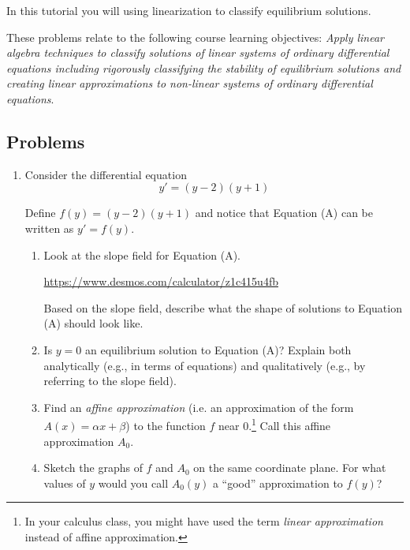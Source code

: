 \begin{objectives}
	In this tutorial you will using linearization to classify equilibrium solutions.

	These problems relate to the following course learning objectives:
	\textit{Apply linear algebra techniques to classify solutions of linear systems of ordinary differential
	equations including rigorously classifying the stability of equilibrium solutions and creating
	linear approximations to non-linear systems of ordinary differential equations}.
\end{objectives}


\subsection*{Problems}

\begin{enumerate}
	\item 	Consider the differential equation
	      \begin{equation}
		      y'=(y-2)(y+1)\tag{A}
	      \end{equation}

	      Define $f(y)=(y-2)(y+1)$ and notice that Equation (A) can be written as $y'=f(y)$.

	      \begin{enumerate}
		      \item Look at the slope field for Equation (A).

		            \url{https://www.desmos.com/calculator/z1c415u4fb}

		            Based on the slope field, describe what the shape of solutions to Equation (A) should look like.

		      \item Is $y=0$ an equilibrium solution to Equation (A)? Explain both analytically (e.g., in terms of equations)
		            and qualitatively (e.g., by referring to the slope field).
		      \item Find an \emph{affine approximation} (i.e. an approximation of the form $A(x) = \alpha x+\beta$)
		            to the function $f$ near $0$.\footnote{ In your calculus class, you might have used the term
			            \emph{linear approximation} instead of affine approximation.} Call this affine approximation $A_0$.

		      \item\label{sketch} Sketch the graphs of $f$ and $A_0$ on the same coordinate plane. For what values of $y$ would you
		            call $A_0(y)$ a ``good'' approximation to $f(y)$?


\end{enumerate}
\end{enumerate}
